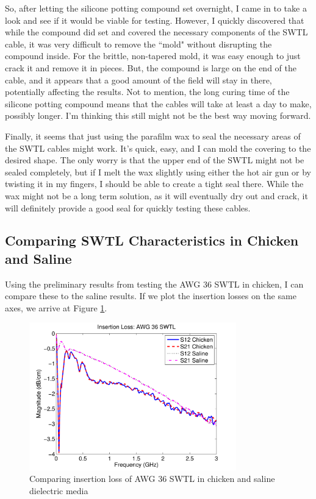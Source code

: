 \documentclass[12pt,onecolumn,titlepage]{article}
\begin{document}
So, after letting the silicone potting compound set overnight, I came in to take a look and see if it would be viable for testing. However, I quickly discovered that while the compound did set and covered the necessary components of the SWTL cable, it was very difficult to remove the ``mold" without disrupting the compound inside. For the brittle, non-tapered mold, it was easy enough to just crack it and remove it in pieces. But, the compound is large on the end of the cable, and it appears that a good amount of the field will stay in there, potentially affecting the results. Not to mention, the long curing time of the silicone potting compound means that the cables will take at least a day to make, possibly longer. I'm thinking this still might not be the best way moving forward.

Finally, it seems that just using the parafilm wax to seal the necessary areas of the SWTL cables might work. It's quick, easy, and I can mold the covering to the desired shape. The only worry is that the upper end of the SWTL might not be sealed completely, but if I melt the wax slightly using either the hot air gun or by twisting it in my fingers, I should be able to create a tight seal there. While the wax might not be a long term solution, as it will eventually dry out and crack, it will definitely provide a good seal for quickly testing these cables. 


\subsection{Comparing SWTL Characteristics in Chicken and Saline}
\indent \indent Using the preliminary results from testing the AWG 36 SWTL in chicken, I can compare these to the saline results. If we plot the insertion losses on the same axes, we arrive at Figure \ref{fig:AWG36_SWTL_cable_loss_chicken_and_saline}.



\begin{figure}[htbp]
	\centering
	\includegraphics[width=0.8\textwidth]{Pictures/18Aug2013/AWG36_SWTL_cable_loss_chicken_and_saline}
	\caption{ Comparing insertion loss of AWG 36 SWTL in chicken and saline dielectric media } 
	\label{fig:AWG36_SWTL_cable_loss_chicken_and_saline}
\end{figure}
\end{document}
